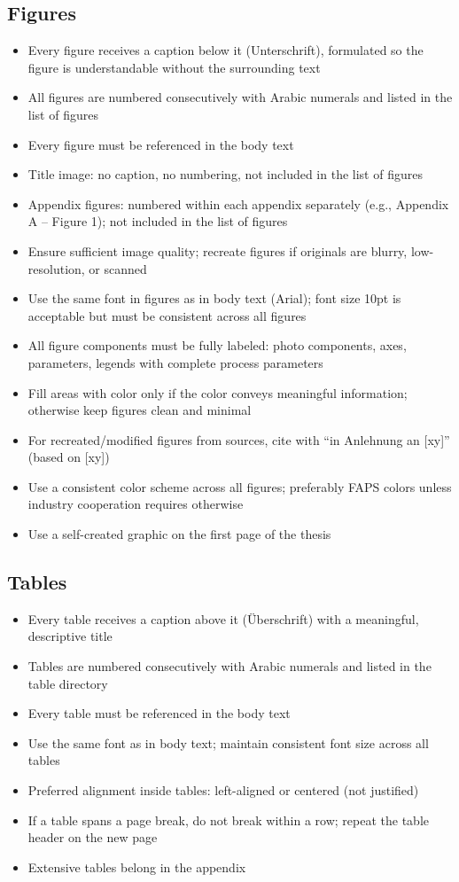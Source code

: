 \subsection{Figures}
\begin{itemize}
    \item Every figure receives a caption below it (Unterschrift), formulated so the figure is understandable without the surrounding text
    \item All figures are numbered consecutively with Arabic numerals and listed in the list of figures
    \item Every figure must be referenced in the body text
    \item Title image: no caption, no numbering, not included in the list of figures
    \item Appendix figures: numbered within each appendix separately (e.g., Appendix A -- Figure 1); not included in the list of figures
    \item Ensure sufficient image quality; recreate figures if originals are blurry, low-resolution, or scanned
    \item Use the same font in figures as in body text (Arial); font size 10pt is acceptable but must be consistent across all figures
    \item All figure components must be fully labeled: photo components, axes, parameters, legends with complete process parameters
    \item Fill areas with color only if the color conveys meaningful information; otherwise keep figures clean and minimal
    \item For recreated/modified figures from sources, cite with ``in Anlehnung an [xy]'' (based on [xy])
    \item Use a consistent color scheme across all figures; preferably FAPS colors unless industry cooperation requires otherwise
    \item Use a self-created graphic on the first page of the thesis
\end{itemize}

\subsection{Tables}
\begin{itemize}
    \item Every table receives a caption above it (Überschrift) with a meaningful, descriptive title
    \item Tables are numbered consecutively with Arabic numerals and listed in the table directory
    \item Every table must be referenced in the body text
    \item Use the same font as in body text; maintain consistent font size across all tables
    \item Preferred alignment inside tables: left-aligned or centered (not justified)
    \item If a table spans a page break, do not break within a row; repeat the table header on the new page
    \item Extensive tables belong in the appendix
\end{itemize}

